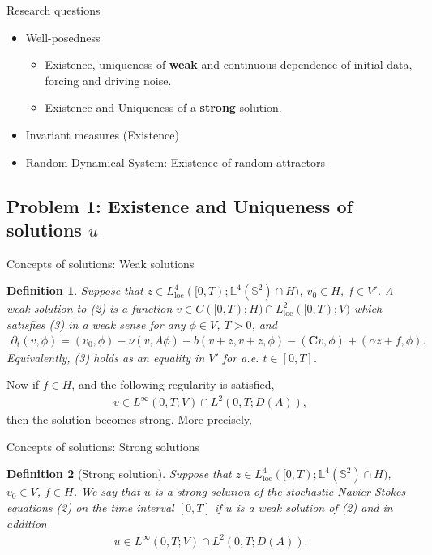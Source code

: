 \documentclass[xcolor=dvipsnames,leqno]{beamer}
\newtheorem{defn}{Definition}
\begin{document}
\begin{frame}{Research questions}
	\begin{itemize}
		\item Well-posedness
		\begin{itemize}
			\item Existence, uniqueness of \textbf{weak} and continuous dependence of initial data, forcing and driving noise.
			\item Existence and Uniqueness of a \textbf{strong} solution.
		\end{itemize}
		\item Invariant measures (Existence)
		\item Random Dynamical System: Existence of random attractors
	\end{itemize}
\end{frame}

\subsection{Problem 1: Existence and Uniqueness of solutions $u$}

\begin{frame}{Concepts of solutions: Weak solutions}
	\begin{defn}
	Suppose that $z\in L^4_{\text{loc}}([0,T);\mathbb{L}^4(\mathbb{S}^2)\cap H)$, $ v_0\in H$, $f\in V'$. A weak solution to (2) is a function $v\in C([0,T);H)\cap L^2_{\text{loc}}([0,T);V)$ which satisfies (3) in a weak sense for any $\phi\in V$, $T>0$, and
	\begin{align*}
\partial_t( v,\phi)=( v_0,\phi)-\nu( v,A\phi)-b( v+ z, v+ z,\phi)-( \mathbf{C} v,\phi)+(\alpha z+ f,\phi).
	\end{align*}
Equivalently, (3) holds as an equality in $V'$ for a.e. $t\in[0,T]$. 
\end{defn}
Now if $ f\in H$, and the following regularity is satisfied,
\begin{align*}
	 v\in L^{\infty}(0,T;V)\cap L^2(0,T;D(A)),
\end{align*}
then the solution becomes strong. More precisely,
\end{frame}

\begin{frame}{Concepts of solutions: Strong solutions}
\begin{defn}[Strong solution]\label{ssoln}
Suppose that $z\in L^4_{\text{loc}}([0,T);\mathbb{L}^4(\mathbb{S}^2)\cap H)$, $ v_0\in V$, $f\in H$. We say that $u$ is a \emph{strong solution} of the stochastic Navier-Stokes equations (2) on the time interval $[0,T]$ if $u$ is a weak solution of (2) and in addition
\begin{align*}
	 u\in L^{\infty}(0,T;V)\cap L^2(0,T;D(A)).
\end{align*}
\end{defn}
\end{frame}
\end{document}
